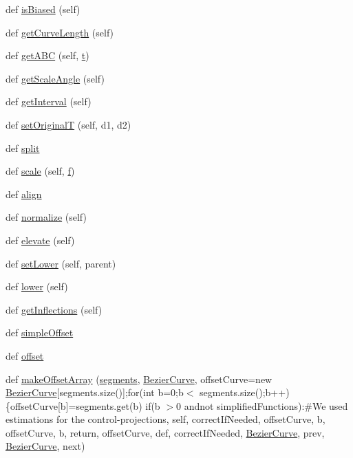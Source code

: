 \begin{DoxyCompactItemize}
\item 
def \hyperlink{classbezier_1_1_bezier_curve_a8f368135ebb837de62ea0b663e3eee70}{is\+Biased} (self)
\item 
def \hyperlink{classbezier_1_1_bezier_curve_a3bff9cf6d4ab0944c6634a95e9afa6db}{get\+Curve\+Length} (self)
\item 
def \hyperlink{classbezier_1_1_bezier_curve_a2cd7ddcf33cb2fc656ec6d422ed5c9d0}{get\+A\+B\+C} (self, \hyperlink{namespacebezier_a21309dd6a23cee0f4b3888de7b66b7ff}{t})
\item 
def \hyperlink{classbezier_1_1_bezier_curve_a600fb93cad2745eaba1b011e5989c4d0}{get\+Scale\+Angle} (self)
\item 
def \hyperlink{classbezier_1_1_bezier_curve_a6cfb8ee3cded08c7a9d7c47d19b4abaf}{get\+Interval} (self)
\item 
def \hyperlink{classbezier_1_1_bezier_curve_a5e38ed6ec16131e7ab51330d66f42297}{set\+Original\+T} (self, d1, d2)
\item 
def \hyperlink{classbezier_1_1_bezier_curve_aa81a80a7a9dff4c45638400d60c2aa00}{split}
\item 
def \hyperlink{classbezier_1_1_bezier_curve_a575e7ea0b4393c4007b0653488dffb00}{scale} (self, \hyperlink{namespacebezier_ad649969fef81af63abc92b1015251242}{f})
\item 
def \hyperlink{classbezier_1_1_bezier_curve_a52119ad0f3360312b0e32391581f3671}{align}
\item 
def \hyperlink{classbezier_1_1_bezier_curve_a17976a1d7e6864d98bec238778702d5d}{normalize} (self)
\item 
def \hyperlink{classbezier_1_1_bezier_curve_a64ef8bef255edb9e13299006896daa7d}{elevate} (self)
\item 
def \hyperlink{classbezier_1_1_bezier_curve_a317f7fd239fe45816b1768fa5a73dd84}{set\+Lower} (self, parent)
\item 
def \hyperlink{classbezier_1_1_bezier_curve_af3f47c83a98f56b011858f24b7eed302}{lower} (self)
\item 
def \hyperlink{classbezier_1_1_bezier_curve_ae23502e8926d52943088db91fd2bc8ba}{get\+Inflections} (self)
\item 
def \hyperlink{classbezier_1_1_bezier_curve_aea4d53a18bc2560c93b35a764fe6625c}{simple\+Offset}
\item 
def \hyperlink{classbezier_1_1_bezier_curve_ae3b2bda88c67445d6cf62a86f121d4bd}{offset}
\item 
def \hyperlink{classbezier_1_1_bezier_curve_a0dbf1d48cda1fee475627cbb46af1913}{make\+Offset\+Array} (\hyperlink{namespacebezier_af5dc7bac630ffee9827391cfaac1e06b}{segments}, \hyperlink{classbezier_1_1_bezier_curve}{Bezier\+Curve}, offset\+Curve=new \hyperlink{classbezier_1_1_bezier_curve}{Bezier\+Curve}\mbox{[}segments.\+size()\mbox{]};for(int b=0;b$<$ segments.\+size();b++)\{offset\+Curve\mbox{[}b\mbox{]}=segments.\+get(b) if(b $>$0 andnot simplified\+Functions)\+:\#We used estimations for the control-\/projections, self, correct\+If\+Needed, offset\+Curve, b, offset\+Curve, b, return, offset\+Curve, def, correct\+If\+Needed, \hyperlink{classbezier_1_1_bezier_curve}{Bezier\+Curve}, prev, \hyperlink{classbezier_1_1_bezier_curve}{Bezier\+Curve}, next)
\end{DoxyCompactItemize}
